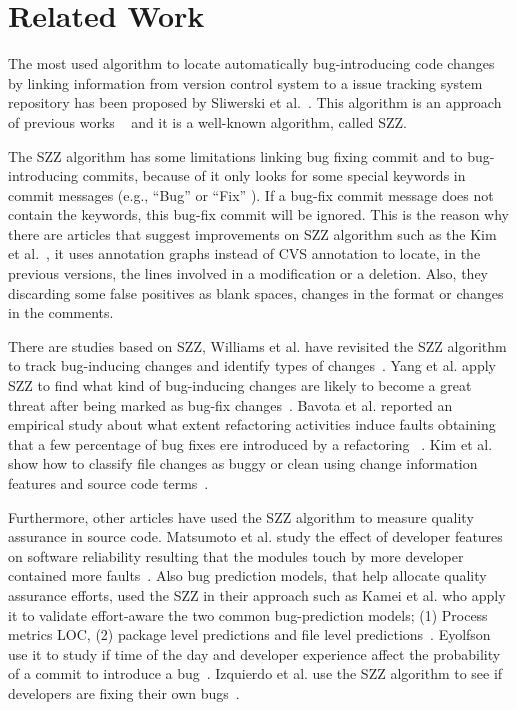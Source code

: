 \documentclass[ifip]{svmult}
\begin{document}
\section{Related Work}
\label{sec:related}

The most used algorithm to locate automatically bug-introducing code changes by linking information from version control system to a issue tracking system repository has been proposed by Sliwerski et al.~\cite{sliwerski2005changes}. This algorithm is an approach of previous works ~\cite{vcubranic2003hipikat,fischer2003analyzing,fischer2003populating} and it is a well-known algorithm, called SZZ.

The SZZ algorithm has some limitations linking bug fixing commit and to bug-introducing commits, because of it only looks for some special keywords in commit messages (e.g., ``Bug'' or ``Fix'' \cite{kamei2007effects}). If a bug-fix commit message does not contain the keywords, this bug-fix commit will be ignored. This is the reason why there are articles that suggest improvements on SZZ algorithm such as the Kim et al.~\cite{kim2006automatic}, it uses annotation graphs instead of CVS annotation to locate, in the previous versions, the lines involved in a modification or a deletion. Also, they discarding some false positives as blank spaces, changes in the format or changes in the comments.

There are studies based on SZZ, Williams et al. have revisited the SZZ algorithm to track bug-inducing changes and identify types of changes~\cite{williams2008szz}. Yang et al. apply SZZ to find what kind of bug-inducing changes are likely to become a great threat after being marked as bug-fix changes~\cite{yangbug}. Bavota et al. reported an empirical study about what extent refactoring activities induce faults obtaining that a few percentage of bug fixes ere introduced by a refactoring ~\cite{bavota2012does}. Kim et al. show how to classify file changes as buggy or clean using change information features and source code terms~\cite{kim2008classifying}.

Furthermore, other articles have used the SZZ algorithm to measure quality assurance in source code. Matsumoto et al. study the effect of developer features on software reliability resulting that the modules touch by more developer contained more faults~\cite{matsumoto2010analysis}. Also bug prediction models, that help allocate quality assurance efforts, used the SZZ in their approach such as Kamei et al. who apply it to validate effort-aware the two common bug-prediction models; (1) Process metrics LOC, (2) package level predictions and file level predictions~\cite{kamei2010revisiting}. Eyolfson use it to study if time of the day and developer experience affect the probability of a commit to introduce a bug~\cite{eyolfson2011time}. Izquierdo et al. use the SZZ algorithm to see if developers are fixing their own bugs~\cite{izquierdo2011developers}.
\end{document}
